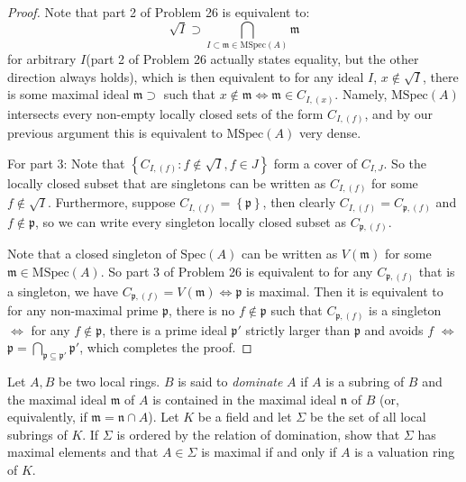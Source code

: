 \documentclass{solution}
\begin{document}
\begin{proof}
    Note that part 2 of Problem 26 is equivalent to:
    $$\sqrt{I} \supset \bigcap\limits_{I \subset \mathfrak{m} \in \mathrm{MSpec}(A)} \mathfrak{m}$$
    for arbitrary $I$(part 2 of Problem 26 actually states equality, but the other direction always holds), which is then equivalent to for any ideal $I$, $x \notin \sqrt{I}$, there is some maximal ideal $\mathfrak{m} \supset$ such that $x \notin \mathfrak{m} \Leftrightarrow \mathfrak{m} \in C_{I, (x)}$. Namely, $\mathrm{MSpec}(A)$ intersects every non-empty locally closed sets of the form $C_{I, (f)}$, and by our previous argument this is equivalent to $\mathrm{MSpec}(A)$ very dense.

    For part 3: Note that $\left\lbrace C_{I, (f)}: f \notin \sqrt{I}, f \in J \right\rbrace$ form a cover of $C_{I, J}$. So the locally closed subset that are singletons can be written as $C_{I, (f)}$ for some $f \notin \sqrt{I}$. Furthermore, suppose $C_{I, (f)} = \left\lbrace \mathfrak{p} \right\rbrace$, then clearly $C_{I, (f)} = C_{\mathfrak{p}, (f)}$ and $f \notin \mathfrak{p}$, so we can write every singleton locally closed subset as $C_{\mathfrak{p}, (f)}$.
    
    Note that a closed singleton of $\mathrm{Spec}(A)$ can be written as $V(\mathfrak{m})$ for some $\mathfrak{m} \in \mathrm{MSpec}(A)$. So part 3 of Problem 26 is equivalent to for any $C_{\mathfrak{p}, (f)}$ that is a singleton, we have $C_{\mathfrak{p}, (f)} = V(\mathfrak{m}) \Leftrightarrow \mathfrak{p}$ is maximal. Then it is equivalent to for any non-maximal prime $\mathfrak{p}$, there is no $f \notin \mathfrak{p}$ such that $C_{\mathfrak{p}, (f)}$ is a singleton $\Leftrightarrow$ for any $f \notin \mathfrak{p}$, there is a prime ideal $\mathfrak{p}'$ strictly larger than $\mathfrak{p}$ and avoids $f$ $\Leftrightarrow$ $\mathfrak{p} = \bigcap\limits_{\mathfrak{p} \subseteq \mathfrak{p}'} \mathfrak{p}'$, which completes the proof.
\end{proof}

\begin{problem}
    Let $A, B$ be two local rings. $B$ is said to \textit{dominate} $A$ if $A$ is a subring of $B$ and the maximal ideal $\mathfrak{m}$ of $A$ is contained in the maximal ideal $\mathfrak{n}$ of $B$ (or, equivalently, if $\mathfrak{m} = \mathfrak{n} \cap A$). Let $K$ be a field and let $\Sigma$ be the set of all local subrings of $K$. If $\Sigma$ is ordered by the relation of domination, show that $\Sigma$ has maximal elements and that $A \in \Sigma$ is maximal if and only if $A$ is a valuation ring of $K$.
\end{problem}
\end{document}
